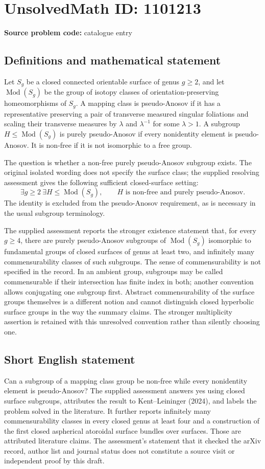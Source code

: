 \documentclass[11pt]{article}
\begin{document}
\section*{UnsolvedMath ID: 1101213}
\textbf{Source problem code:} catalogue entry
\subsection{Definitions and mathematical statement}
Let $S_g$ be a closed connected orientable surface of genus $g\geq2$, and let $\operatorname{Mod}(S_g)$ be the group of isotopy classes of orientation-preserving homeomorphisms of $S_g$. A mapping class is pseudo-Anosov if it has a representative preserving a pair of transverse measured singular foliations and scaling their transverse measures by $\lambda$ and $\lambda^{-1}$ for some $\lambda>1$. A subgroup $H\leq\operatorname{Mod}(S_g)$ is purely pseudo-Anosov if every nonidentity element is pseudo-Anosov. It is non-free if it is not isomorphic to a free group.

The question is whether a non-free purely pseudo-Anosov subgroup exists. The original isolated wording does not specify the surface class; the supplied resolving assessment gives the following sufficient closed-surface setting:
\[
 \exists g\geq2\ \exists H\leq\operatorname{Mod}(S_g),\qquad
 H\text{ is non-free and purely pseudo-Anosov}.
\]
The identity is excluded from the pseudo-Anosov requirement, as is necessary in the usual subgroup terminology.

The supplied assessment reports the stronger existence statement that, for every $g\geq4$, there are purely pseudo-Anosov subgroups of $\operatorname{Mod}(S_g)$ isomorphic to fundamental groups of closed surfaces of genus at least two, and infinitely many commensurability classes of such subgroups. The sense of commensurability is not specified in the record. In an ambient group, subgroups may be called commensurable if their intersection has finite index in both; another convention allows conjugating one subgroup first. Abstract commensurability of the surface groups themselves is a different notion and cannot distinguish closed hyperbolic surface groups in the way the summary claims. The stronger multiplicity assertion is retained with this unresolved convention rather than silently choosing one.
\subsection{Short English statement}
Can a subgroup of a mapping class group be non-free while every nonidentity element is pseudo-Anosov? The supplied assessment answers yes using closed surface subgroups, attributes the result to Kent--Leininger (2024), and labels the problem solved in the literature. It further reports infinitely many commensurability classes in every closed genus at least four and a construction of the first closed aspherical atoroidal surface bundles over surfaces. Those are attributed literature claims. The assessment's statement that it checked the arXiv record, author list and journal status does not constitute a source visit or independent proof by this draft.
\end{document}
